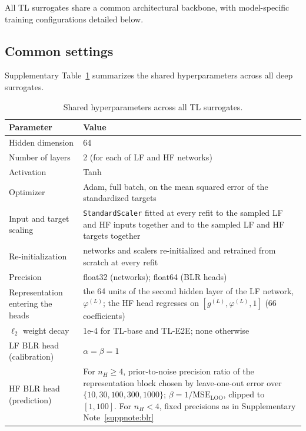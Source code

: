 
All TL surrogates share a common architectural backbone, with model-specific training
configurations detailed below.

\subsection{Common settings}
\label{suppsec:common_settings}
Supplementary Table~\ref{supptab:common_hyperparams} summarizes the shared hyperparameters across all deep
surrogates.

\begin{table}[h]
\centering
\caption{Shared hyperparameters across all TL surrogates.}
\label{supptab:common_hyperparams}
\begin{tabular}{lp{8.5cm}}
\toprule
\textbf{Parameter} & \textbf{Value} \\
\midrule
Hidden dimension & 64 \\
Number of layers & 2 (for each of LF and HF networks) \\
Activation & Tanh \\
Optimizer & Adam, full batch, on the mean squared error of the standardized targets \\
Input and target scaling & \texttt{StandardScaler} fitted at every refit to the sampled LF and HF inputs together and to the sampled LF and HF targets together \\
Re-initialization & networks and scalers re-initialized and retrained from scratch at every refit \\
Precision & float32 (networks); float64 (BLR heads) \\
Representation entering the heads & the 64 units of the second hidden layer of the LF network, $\varphi^{(L)}$; the HF head regresses on $[g^{(L)}, \varphi^{(L)}, 1]$ (66 coefficients) \\
$\ell_2$ weight decay & 1e-4 for TL-base and TL-E2E; none otherwise \\
LF BLR head (calibration) & $\alpha = \beta = 1$ \\
HF BLR head (prediction) & For $n_H \ge 4$, prior-to-noise precision ratio of the representation block chosen by leave-one-out error over $\{10, 30, 100, 300, 1000\}$; $\beta = 1/\mathrm{MSE}_{\mathrm{LOO}}$, clipped to $[1, 100]$. For $n_H < 4$, fixed precisions as in Supplementary Note~\ref{suppnote:blr} \\
\bottomrule
\end{tabular}
\end{table}

